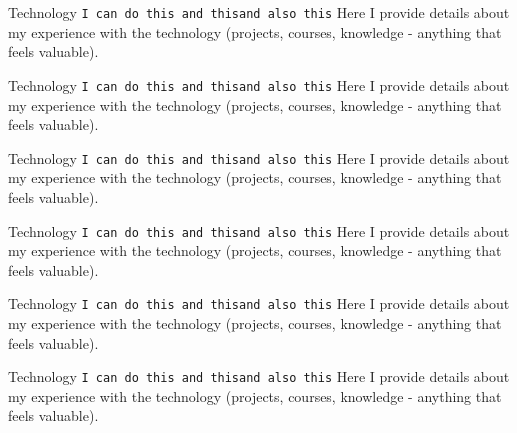 \documentclass[9pt]{developercv} %
\begin{document}
\newpage




\begin{tcolorbox}[]
\begin{tcolorbox}[colback=secondary, colframe=secondary_dark, top=-10pt, bottom=0pt, valign=center, halign=center]
\end{tcolorbox}
\vspace{8pt}
\begin{detentrylist}
	\detentry
		{Technology} %
		{\texttt{I can do this }\slashsep\texttt{and this}\slashsep\texttt{and also this}} %
		{Here I provide details about my experience with the technology (projects, courses, knowledge - anything that feels valuable).} %
	
	\detentry
		{Technology} %
		{\texttt{I can do this }\slashsep\texttt{and this}\slashsep\texttt{and also this}} %
		{Here I provide details about my experience with the technology (projects, courses, knowledge - anything that feels valuable).} %
		
		\detentry
		{Technology} %
		{\texttt{I can do this }\slashsep\texttt{and this}\slashsep\texttt{and also this}} %
		{Here I provide details about my experience with the technology (projects, courses, knowledge - anything that feels valuable).} %
		
		\detentry
		{Technology} %
		{\texttt{I can do this }\slashsep\texttt{and this}\slashsep\texttt{and also this}} %
		{Here I provide details about my experience with the technology (projects, courses, knowledge - anything that feels valuable).} %
		
		\detentry
		{Technology} %
		{\texttt{I can do this }\slashsep\texttt{and this}\slashsep\texttt{and also this}} %
		{Here I provide details about my experience with the technology (projects, courses, knowledge - anything that feels valuable).} %
		 
		 \detentry
		{Technology} %
		{\texttt{I can do this }\slashsep\texttt{and this}\slashsep\texttt{and also this}} %
		{Here I provide details about my experience with the technology (projects, courses, knowledge - anything that feels valuable).} %
		

\end{detentrylist}
\end{tcolorbox}
\end{document}
